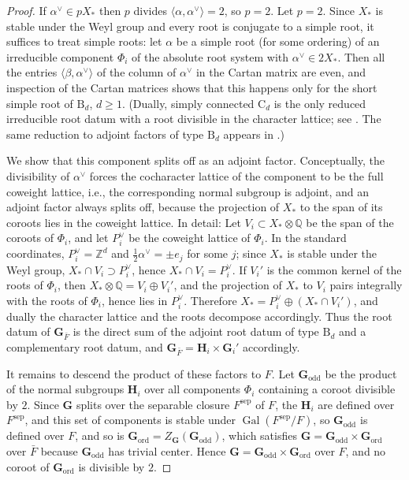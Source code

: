 \documentclass[11pt,reqno]{amsart}
\numberwithin{equation}{section}
\theoremstyle{plain}
\theoremstyle{definition}
\theoremstyle{remark}
\theoremstyle{plain}
\newcommand{\Z}{\mathbb{Z}}      %
\newcommand{\Q}{\mathbb{Q}}      %
\newcommand{\bG}{\mathbf{G}}     %
\newcommand{\bH}{\mathbf{H}}     %
\newcommand{\Godd}{\bG_{\mathrm{odd}}}
\newcommand{\Gord}{\bG_{\mathrm{ord}}}
\DeclareMathOperator{\Gal}{Gal}
\begin{document}
\begin{proof}
If $\alpha^\vee\in pX_*$ then $p$ divides $\langle\alpha,\alpha^\vee\rangle=2$,
so $p=2$. Let $p=2$. Since $X_*$ is stable under the Weyl group and every root is
conjugate to a simple root, it suffices to treat simple roots: let
$\alpha$ be a simple root (for some ordering)
of an irreducible component $\Phi_i$ of the absolute root system with
$\alpha^\vee\in2X_*$. Then all the entries $\langle\beta,\alpha^\vee\rangle$
of the column of $\alpha^\vee$ in the Cartan matrix are even, and
inspection of the Cartan matrices shows that this happens only for the
short simple root of $\mathrm B_d$, $d\ge1$. (Dually, simply connected
$\mathrm C_d$ is the only reduced irreducible root datum with a root
divisible in the character lattice; see \cite[proof of Theorem~2.3.10 and
Remark~5.3.11]{MR3362817}. The same reduction to adjoint factors of type
$\mathrm B_d$ appears in \cite[\S4]{ST26}.)

We show that this component splits off as an adjoint factor.
Conceptually, the divisibility of $\alpha^\vee$ forces the cocharacter
lattice of the component to be the full coweight lattice, i.e., the
corresponding normal subgroup is adjoint, and an adjoint factor always
splits off, because the projection of $X_*$ to the span of its coroots
lies in the coweight lattice. In detail:
Let $V_i\subset X_*\otimes\Q$ be the span of the coroots of $\Phi_i$, and let $P_i^\vee$ be the
coweight lattice of $\Phi_i$. In the standard
coordinates, $P_i^\vee=\Z^d$ and $\tfrac12\alpha^\vee=\pm e_j$ for some
$j$; since $X_*$ is stable under the Weyl group, $X_*\cap V_i\supset P_i^\vee$,
hence $X_*\cap V_i=P_i^\vee$. If $V_i'$ is the common kernel of the roots
of $\Phi_i$, then $X_*\otimes\Q=V_i\oplus V_i'$, and the projection of
$X_*$ to $V_i$ pairs integrally with the roots of $\Phi_i$, hence lies
in $P_i^\vee$. Therefore $X_*=P_i^\vee\oplus(X_*\cap V_i')$, and
dually the character lattice and the roots decompose accordingly. Thus
the root datum of $\bG_{\bar F}$ is the direct sum of the adjoint root
datum of type $\mathrm B_d$ and a complementary root datum, and
$\bG_{\bar F}=\bH_i\times\bG_i'$ accordingly.

It remains to descend the product of these factors to $F$.
Let $\Godd$ be the product of the normal subgroups $\bH_i$ over all components $\Phi_i$ containing
a coroot divisible by $2$. Since $\bG$ splits over the separable closure $F^{\mathrm{sep}}$ of $F$, the $\bH_i$ are defined over $F^{\mathrm{sep}}$, and this set of components is stable under $\Gal(F^{\mathrm{sep}}/F)$, so $\Godd$ is defined over $F$, and so is
$\Gord=Z_\bG(\Godd)$, which satisfies $\bG=\Godd\times\Gord$ over $\bar F$
because $\Godd$ has trivial center. Hence $\bG=\Godd\times\Gord$ over $F$,
and no coroot of $\Gord$ is divisible by $2$.


\end{proof}
\end{document}
